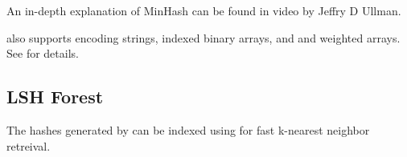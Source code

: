 \documentclass[letterpaper,10pt,english]{sphinxmanual}
\begin{document}
An in-depth explanation of MinHash can be found in
 video by Jeffry D
Ullman.

 also supports encoding strings, indexed binary arrays, and
 and  weighted arrays. See {\hyperref[\detokenize{documentation:minhash-doc}]{}} for details.


\subsection{LSH Forest}
\label{\detokenize{tutorial:lsh-forest}}
The hashes generated by  can be indexed using 
for fast k-nearest neighbor retreival.
\end{document}
